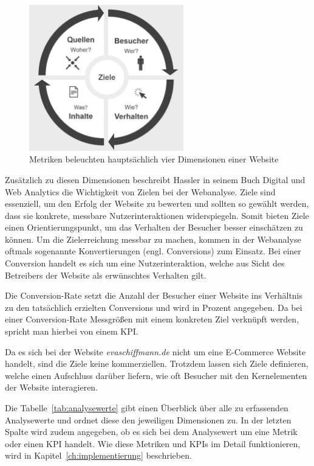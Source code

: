 \begin{figure}[H]
    \centering
    \includegraphics[width=0.6\textwidth, keepaspectratio]{images/dimensionen.png}
    \caption{Metriken beleuchten hauptsächlich vier Dimensionen einer Website \parencite[Kap.5.7]{Hassler2019}}
    \label{fig:dimensionen}
\end{figure}


Zusätzlich zu diesen Dimensionen beschreibt Hassler in seinem Buch \glqq Digital und Web Analytics\grqq{} die Wichtigkeit von Zielen bei der Webanalyse. Ziele sind essenziell, um den Erfolg der Website zu bewerten und sollten so gewählt werden, dass sie konkrete, messbare Nutzerinteraktionen widerspiegeln. Somit bieten Ziele einen Orientierungspunkt, um das Verhalten der Besucher besser einschätzen zu können. Um die Zielerreichung messbar zu machen, kommen in der Webanalyse oftmals sogenannte Konvertierungen (engl. Conversions) zum Einsatz. Bei einer Conversion handelt es sich um eine Nutzerinteraktion, welche aus Sicht des Betreibers der Website als erwünschtes Verhalten gilt. \parencite[Kap.13]{Hassler2019}

Die Conversion-Rate setzt die Anzahl der Besucher einer Website ins Verhältnis zu den tatsächlich erzielten Conversions und wird in Prozent angegeben. Da bei einer Conversion-Rate Messgrößen mit einem konkreten Ziel verknüpft werden, spricht man hierbei von einem KPI. \parencite{RyteConversion}

Da es sich bei der Website \textit{evaschiffmann.de} nicht um eine E-Commerce Website handelt, sind die Ziele keine kommerziellen. Trotzdem lassen sich Ziele definieren, welche einen Aufschluss darüber liefern, wie oft Besucher mit den Kernelementen der Website interagieren.

Die Tabelle~\ref{tab:analysewerte} gibt einen Überblick über alle zu erfassenden Analysewerte und ordnet diese den jeweiligen Dimensionen zu. In der letzten Spalte wird zudem angegeben, ob es sich bei dem Analysewert um eine Metrik oder einen KPI handelt. Wie diese Metriken und KPIs im Detail funktionieren, wird in Kapitel~\ref{ch:implementierung} beschrieben.


